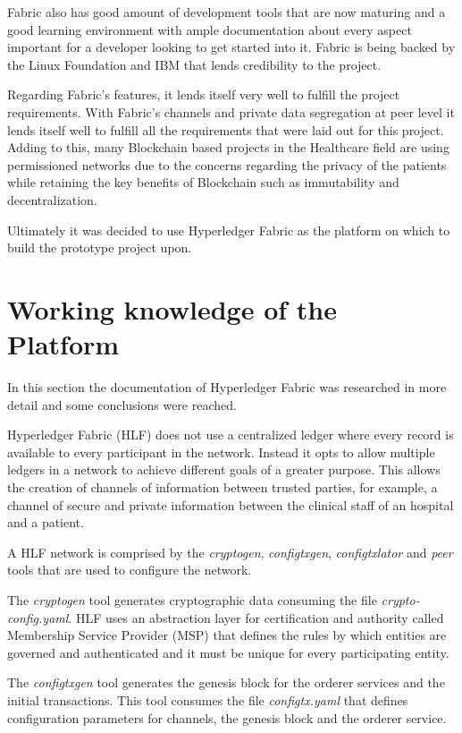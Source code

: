 Fabric also has good amount of development tools that are now maturing and a
good learning environment with ample documentation about every aspect important
for a developer looking to get started into it. Fabric is being backed by the
Linux Foundation and IBM that lends credibility to the project.

Regarding Fabric's features, it lends itself very well to fulfill the project
requirements. With Fabric's channels and private data segregation at peer level
it lends itself well to fulfill all the requirements that were laid out for
this project. Adding to this, many Blockchain based projects in the Healthcare
field are using permissioned networks due to the concerns regarding the privacy
of the patients while retaining the key benefits of Blockchain such as
immutability and decentralization.

Ultimately it was decided to use Hyperledger Fabric as the platform on which to
build the prototype project upon.


\section{Working knowledge of the Platform}

In this section the documentation of Hyperledger Fabric was researched in more
detail and some conclusions were reached.

Hyperledger Fabric (HLF) does not use a centralized ledger where every record
is available to every participant in the network.  Instead it opts to allow
multiple ledgers in a network to achieve different goals of a greater purpose.
This allows the creation of channels of information between trusted parties,
for example, a channel of secure and private information between the clinical
staff of an hospital and a patient.

A HLF network is comprised by the \textit{cryptogen}, \textit{configtxgen},
\textit{configtxlator} and \textit{peer} tools that are used to configure the
network.

The \textit{cryptogen} tool generates cryptographic data consuming the file
\textit{crypto-config.yaml}.  HLF uses an abstraction layer for certification
and authority called Membership Service Provider (MSP) that defines the rules
by which entities are governed and authenticated and it must be unique for
every participating entity.

The \textit{configtxgen} tool generates the genesis block for the orderer
services and the initial transactions.  This tool consumes the file
\textit{configtx.yaml} that defines configuration parameters for channels, the
genesis block and the orderer service.

